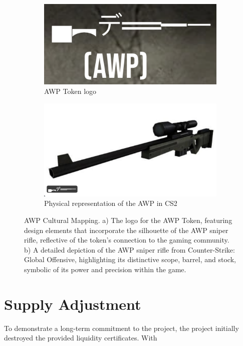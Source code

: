 \documentclass[journal,onecolumn,]{IEEEtran}
\begin{document}
		\begin{figure}[h]
		\centering
		\begin{subfigure}{0.45\linewidth}
			\includegraphics[width=1\linewidth]{figure/1.png}
			\caption{AWP Token logo}
			\label{pic:12}
		\end{subfigure}
		\begin{subfigure}{0.45\linewidth}
			\includegraphics[width=1\linewidth]{figure/3.png}
			\caption{Physical representation of the AWP in CS2}
			\label{pic:11}
		\end{subfigure}
		\caption{
			AWP Cultural Mapping. a) The logo for the AWP Token, featuring design elements that incorporate the silhouette of the AWP sniper rifle, reflective of the token's connection to the gaming community. b) A detailed depiction of the AWP sniper rifle from Counter-Strike: Global Offensive, highlighting its distinctive scope, barrel, and stock, symbolic of its power and precision within the game. }
		\label{pic:1}
		\vspace{-0.5cm}
	\end{figure}
	
	
	\section{Supply Adjustment}
	To demonstrate a long-term commitment to the project, the project initially destroyed the provided liquidity certificates. With 
	
\end{document}
